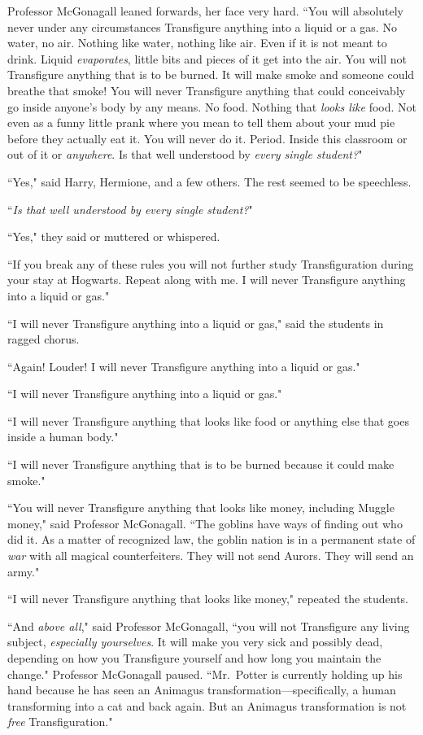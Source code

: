 Professor McGonagall leaned forwards, her face very hard. ``You will absolutely never under any circumstances Transfigure anything into a liquid or a gas. No water, no air. Nothing like water, nothing like air. Even if it is not meant to drink. Liquid \emph{evaporates}, little bits and pieces of it get into the air. You will not Transfigure anything that is to be burned. It will make smoke and someone could breathe that smoke! You will never Transfigure anything that could conceivably go inside anyone's body by any means. No food. Nothing that \emph{looks like} food. Not even as a funny little prank where you mean to tell them about your mud pie before they actually eat it. You will never do it. Period. Inside this classroom or out of it or \emph{anywhere}. Is that well understood by \emph{every single student?}"

``Yes," said Harry, Hermione, and a few others. The rest seemed to be speechless.

``\emph{Is that well understood by every single student?}"

``Yes," they said or muttered or whispered.

``If you break any of these rules you will not further study Transfiguration during your stay at Hogwarts. Repeat along with me. I will never Transfigure anything into a liquid or gas."

``I will never Transfigure anything into a liquid or gas," said the students in ragged chorus.

``Again! Louder! I will never Transfigure anything into a liquid or gas."

``I will never Transfigure anything into a liquid or gas."

``I will never Transfigure anything that looks like food or anything else that goes inside a human body."

``I will never Transfigure anything that is to be burned because it could make smoke."

``You will never Transfigure anything that looks like money, including Muggle money," said Professor McGonagall. ``The goblins have ways of finding out who did it. As a matter of recognized law, the goblin nation is in a permanent state of \emph{war} with all magical counterfeiters. They will not send Aurors. They will send an army."

``I will never Transfigure anything that looks like money," repeated the students.

``And \emph{above all}," said Professor McGonagall, ``you will not Transfigure any living subject, \emph{especially yourselves}. It will make you very sick and possibly dead, depending on how you Transfigure yourself and how long you maintain the change." Professor McGonagall paused. ``Mr.~Potter is currently holding up his hand because he has seen an Animagus transformation—specifically, a human transforming into a cat and back again. But an Animagus transformation is not \emph{free} Transfiguration."

